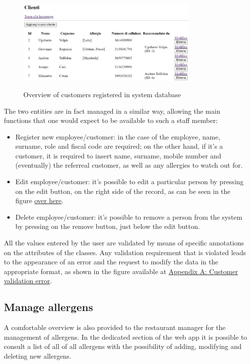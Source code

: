 \documentclass{article}
\begin{document}
    \begin{figure}[H]
        \centering
        \includegraphics[width=0.8\textwidth]{images/customers_overview.jpg}
        \label{fig:customers_overview}
        \caption{Overview of customers registered in system database}
    \end{figure}

    The two entities are in fact managed in a similar way, allowing the main functions that one would expect to be available to such a staff member:

    \begin{itemize}
        \item Register new employee/customer: in the case of the employee, name, surname, role and fiscal code are required; on the other hand, if it's a customer, it is required to insert name, surname, mobile number and (eventually) the referreal customer, as well as any allergies to watch out for.
        \item Edit employee/customer: it's possible
        to edit a particular person by pressing on the edit button, on the right side of the record, as can be seen in the figure \hyperref[fig:customers_overview]{over here}.
        \item Delete employee/customer: it's possible
        to remove a person from the system by pressing on the remove button, just below the edit button.
    \end{itemize}

    All the values entered by the user are validated by means of specific annotations on the attributes of the classes. Any validation requirement that is violated leads to the appearance of an error and the request to modify the data in the appropriate format, as shown in the figure available at \hyperref[fig:customer_validation_error]{Appendix A: Customer validation error}.


    \subsection*{Manage allergens}
    A comfortable overview is also provided to the restaurant manager for the management of allergens. In the dedicated section of the web app it is possible to consult a list of all of all allergens with the possibility of adding, modifying and deleting new allergens.
\end{document}
